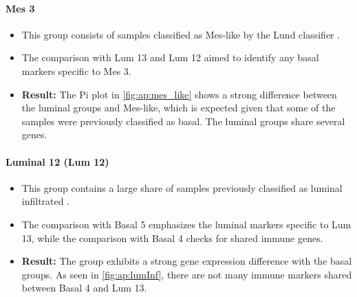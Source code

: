 \paragraph*{Mes 3}

\begin{itemize}
    \item This group consists of samples classified as Mes-like by the Lund classifier \citep{Marzouka2018-ge}.
    \item The comparison with Lum 13 and Lum 12 aimed to identify any basal markers specific to Mes 3.
    \item \textbf{Result:} The Pi plot in \cref{fig:ap:mes_like} shows a strong difference between the luminal groups and Mes-like, which is expected given that some of the samples were previously classified as basal. The luminal groups share several genes.
\end{itemize}

\paragraph*{Luminal 12 (Lum 12)}
 
\begin{itemize}
    \item This group contains a large share of samples previously classified as luminal infiltrated \cite{Robertson2017-mg,Kamoun2020-tj}.
    \item The comparison with Basal 5 emphasizes the luminal markers specific to Lum 13, while the comparison with Basal 4 checks for shared immune genes.
    \item \textbf{Result:} The group exhibits a strong gene expression difference with the basal groups. As seen in \cref{fig:ap:lumInf}, there are not many immune markers shared between Basal 4 and Lum 13.
\end{itemize}


